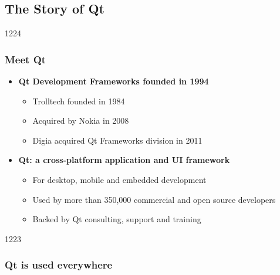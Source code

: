 %
%
%
%

\subsection{The Story of Qt}

\begin{slide}{1224}
  \frametitle{Meet Qt}
  \begin{itemize}
  \item \textbf{Qt Development Frameworks founded in 1994}
    \begin{itemize}
    \item Trolltech founded in 1984
    \item Acquired by Nokia in 2008
    \item Digia acquired Qt Frameworks division in 2011
    \end{itemize}
  \item \textbf{Qt: a cross-platform application and UI framework}
    \begin{itemize}
    \item For desktop, mobile and embedded development
    \item Used by more than 350,000 commercial and open source developers
    \item Backed by Qt consulting, support and training
    \end{itemize}
 \end{itemize}
 \vfill
\end{slide}


\begin{slide}{1223}
  \frametitle{Qt is used everywhere}
  \hspace*{0.025\pdfpagewidth}
\end{slide}

